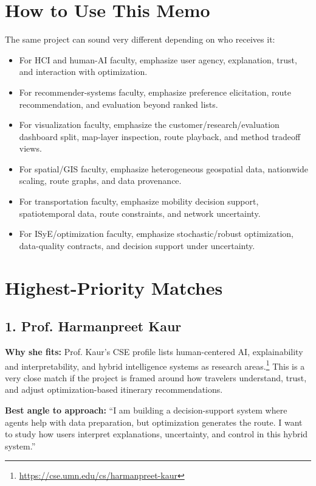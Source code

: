 \documentclass[11pt,a4paper]{article}
\begin{document}
\section*{How to Use This Memo}

\noindent The same project can sound very different depending on who receives it:

\begin{itemize}
    \item For HCI and human-AI faculty, emphasize user agency, explanation, trust, and interaction with optimization.
    \item For recommender-systems faculty, emphasize preference elicitation, route recommendation, and evaluation beyond ranked lists.
    \item For visualization faculty, emphasize the customer/research/evaluation dashboard split, map-layer inspection, route playback, and method tradeoff views.
    \item For spatial/GIS faculty, emphasize heterogeneous geospatial data, nationwide scaling, route graphs, and data provenance.
    \item For transportation faculty, emphasize mobility decision support, spatiotemporal data, route constraints, and network uncertainty.
    \item For ISyE/optimization faculty, emphasize stochastic/robust optimization, data-quality contracts, and decision support under uncertainty.
\end{itemize}

\section*{Highest-Priority Matches}

\subsection*{1. Prof. Harmanpreet Kaur}

\noindent \textbf{Why she fits:} Prof. Kaur's CSE profile lists human-centered AI, explainability and interpretability, and hybrid intelligence systems as research areas.\footnote{\url{https://cse.umn.edu/cs/harmanpreet-kaur}} This is a very close match if the project is framed around how travelers understand, trust, and adjust optimization-based itinerary recommendations.

\noindent \textbf{Best angle to approach:} ``I am building a decision-support system where agents help with data preparation, but optimization generates the route. I want to study how users interpret explanations, uncertainty, and control in this hybrid system.''
\end{document}
